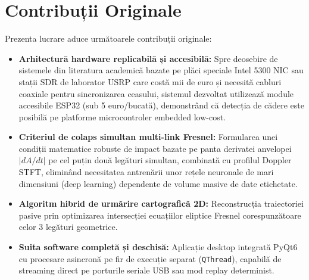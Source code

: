 \section{Contribuții Originale}
Prezenta lucrare aduce următoarele contribuții originale:
\begin{itemize}
    \item \textbf{Arhitectură hardware replicabilă și accesibilă:} Spre deosebire de sistemele din literatura academică bazate pe plăci speciale Intel 5300 NIC \cite{halperin2011tool} sau stații SDR de laborator USRP \cite{adib2013see} care costă mii de euro și necesită cabluri coaxiale pentru sincronizarea ceasului, sistemul dezvoltat utilizează module accesibile ESP32 (sub 5 euro/bucată), demonstrând că detecția de cădere este posibilă pe platforme microcontroler embedded low-cost.
    \item \textbf{Criteriul de colaps simultan multi-link Fresnel:} Formularea unei condiții matematice robuste de impact bazate pe panta derivatei anvelopei $|dA/dt|$ pe cel puțin două legături simultan, combinată cu profilul Doppler STFT, eliminând necesitatea antrenării unor rețele neuronale de mari dimensiuni (deep learning) dependente de volume masive de date etichetate.
    \item \textbf{Algoritm hibrid de urmărire cartografică 2D:} Reconstrucția traiectoriei pasive prin optimizarea intersecției ecuațiilor eliptice Fresnel corespunzătoare celor 3 legături geometrice.
    \item \textbf{Suita software completă și deschisă:} Aplicație desktop integrată PyQt6 cu procesare asincronă pe fir de execuție separat (\texttt{QThread}), capabilă de streaming direct pe porturile seriale USB sau mod replay determinist.
\end{itemize}

